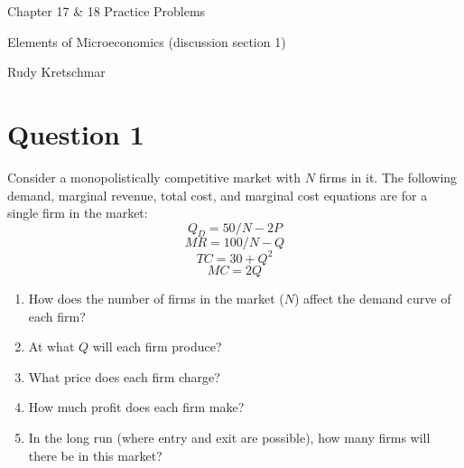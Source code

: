 \documentclass[12pt]{article}
\begin{document}
\begin{center}
\Large Chapter 17 \& 18 Practice Problems

\medskip

\normalsize Elements of Microeconomics (discussion section 1)

\medskip

\small Rudy Kretschmar
\end{center}



\section*{Question 1}
Consider a monopolistically competitive market with $N$ firms in it. The following demand, marginal revenue, total cost, and marginal cost equations are for a single firm in the market:
\[Q_D = 50/N - 2P\]
\[MR = 100/N - Q\]
\[TC = 30 + Q^2\]
\[MC = 2Q\]
\begin{enumerate}[label = (\alph*)]
    \item How does the number of firms in the market ($N$) affect the demand curve of each firm?
    \item At what $Q$ will each firm produce? 
    \item What price does each firm charge?
    \item How much profit does each firm make?
    \item In the long run (where entry and exit are possible), how many firms will there be in this market?
\end{enumerate}
\end{document}
